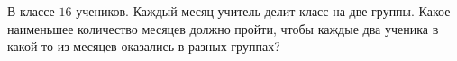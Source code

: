 В классе $16$ учеников. Каждый месяц учитель делит класс на две группы. Какое наименьшее количество месяцев должно пройти, чтобы каждые два ученика в какой-то из месяцев оказались в разных группах?